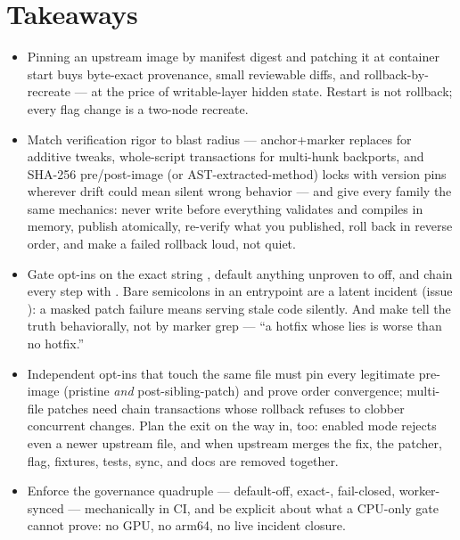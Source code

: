 \section*{Takeaways}
\begin{itemize}
\item Pinning an upstream image by manifest digest and patching it at
  container start buys byte-exact provenance, small reviewable diffs, and
  rollback-by-recreate --- at the price of writable-layer hidden state.
  Restart is not rollback; every flag change is a two-node recreate.
\item Match verification rigor to blast radius --- anchor+marker replaces for
  additive tweaks, whole-script transactions for multi-hunk backports, and
  SHA-256 pre/post-image (or AST-extracted-method) locks with version pins
  wherever drift could mean silent wrong behavior --- and give every family
  the same mechanics: never write before everything validates and compiles in
  memory, publish atomically, re-verify what you published, roll back in
  reverse order, and make a failed rollback loud, not quiet.
\item Gate opt-ins on the exact string , default anything unproven
  to off, and chain every step with . Bare semicolons in an
  entrypoint are a latent incident (issue ): a masked patch
  failure means serving stale code silently. And make  tell
  the truth behaviorally, not by marker grep --- ``a hotfix whose
   lies is worse than no hotfix.''
\item Independent opt-ins that touch the same file must pin every legitimate
  pre-image (pristine \emph{and} post-sibling-patch) and prove order
  convergence; multi-file patches need chain transactions whose rollback
  refuses to clobber concurrent changes. Plan the exit on the way in, too:
  enabled mode rejects even a newer upstream file, and when upstream merges
  the fix, the patcher, flag, fixtures, tests, sync, and docs are removed
  together.
\item Enforce the governance quadruple --- default-off, exact-,
  fail-closed, worker-synced --- mechanically in CI, and be explicit about
  what a CPU-only gate cannot prove: no GPU, no arm64, no live incident
  closure.
\end{itemize}


